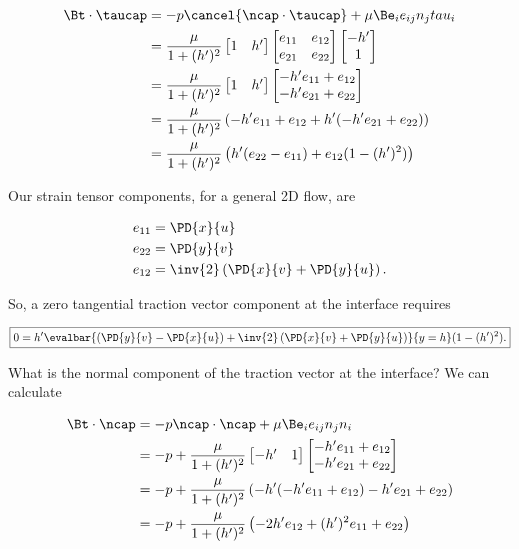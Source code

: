 \begin{align*}
\Bt \cdot \taucap 
&=
-p \cancel{\ncap \cdot \taucap} + \mu \Be_i e_{ij} n_j tau_i \\
&=
\frac{\mu}{1 + (h')^2}
\begin{bmatrix}
1 & h' 
\end{bmatrix}
\begin{bmatrix}
e_{11} & e_{12} \\
e_{21} & e_{22}
\end{bmatrix}
\begin{bmatrix}
-h'  \\
1
\end{bmatrix} \\
&=
\frac{\mu}{1 + (h')^2}
\begin{bmatrix}
1 & h' 
\end{bmatrix}
\begin{bmatrix}
-h' e_{11} + e_{12} \\
-h' e_{21} + e_{22}
\end{bmatrix} \\
&=
\frac{\mu}{1 + (h')^2}
\left(
-h' e_{11} + e_{12} + h'( -h' e_{21} + e_{22} )
\right) \\
&=
\frac{\mu}{1 + (h')^2}
\left(
h' (e_{22} - e_{11} )
+ e_{12} (1 - (h')^2 )
\right) 
\end{align*}

Our strain tensor components, for a general 2D flow, are

\begin{align}\label{eqn:inclinedFlowWithoutConstantHeightAssumption:200}
e_{11} &= \PD{x}{u} \\
e_{22} &= \PD{y}{v} \\
e_{12} &= 
\inv{2} \left( 
\PD{x}{v} +
\PD{y}{u}
\right).
\end{align}

So, a zero tangential traction vector component at the interface requires

\begin{equation}\label{eqn:inclinedFlowWithoutConstantHeightAssumption:220}
\boxed{
0 = h' \evalbar{\left( \PD{y}{v} - \PD{x}{u} \right) + 
\inv{2} \left( 
\PD{x}{v} +
\PD{y}{u}
\right)
}{y = h}
(1 - (h')^2 ).
}
\end{equation}

What is the normal component of the traction vector at the interface?  We can calculate

\begin{align*}
\Bt \cdot \ncap 
&=
-p \ncap \cdot \ncap + \mu \Be_i e_{ij} n_j n_i \\
&=
-p
+
\frac{\mu}{1 + (h')^2}
\begin{bmatrix}
-h' & 1
\end{bmatrix}
\begin{bmatrix}
-h' e_{11} + e_{12} \\
-h' e_{21} + e_{22}
\end{bmatrix} \\
&=
-p
+
\frac{\mu}{1 + (h')^2}
\left(
-h'(-h' e_{11} + e_{12}) -h' e_{21} + e_{22}
\right)  \\
&=
-p
+
\frac{\mu}{1 + (h')^2}
\left(
-2 h' e_{12} 
+ (h')^2 e_{11} + e_{22}
\right)
\end{align*}

